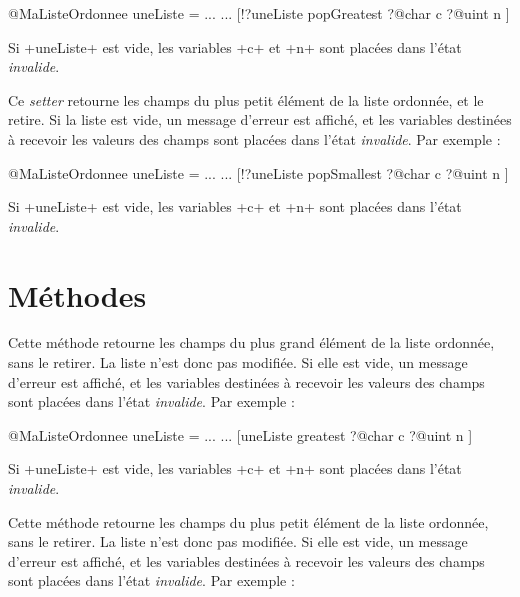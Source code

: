 \begin{galgas}
@MaListeOrdonnee uneListe = ...
...
[!?uneListe popGreatest
  ?@char c
  ?@uint n
]
\end{galgas}

Si \ggs+uneListe+ est vide, les variables \ggs+c+ et \ggs+n+ sont placées dans l'état \emph{invalide}.



Ce \emph{setter} retourne les champs du plus petit élément de la liste ordonnée, et le retire. Si la liste est vide, un message d'erreur est affiché, et les variables destinées à recevoir les valeurs des champs sont placées dans l'état \emph{invalide}. Par exemple :

\begin{galgas}
@MaListeOrdonnee uneListe = ...
...
[!?uneListe popSmallest
  ?@char c
  ?@uint n
]
\end{galgas}

Si \ggs+uneListe+ est vide, les variables \ggs+c+ et \ggs+n+ sont placées dans l'état \emph{invalide}.










\section{Méthodes}


Cette méthode retourne les champs du plus grand élément de la liste ordonnée, sans le retirer. La liste n'est donc pas modifiée. Si elle est vide, un message d'erreur est affiché, et les variables destinées à recevoir les valeurs des champs sont placées dans l'état \emph{invalide}. Par exemple :

\begin{galgas}
@MaListeOrdonnee uneListe = ...
...
[uneListe greatest
  ?@char c
  ?@uint n
]
\end{galgas}

Si \ggs+uneListe+ est vide, les variables \ggs+c+ et \ggs+n+ sont placées dans l'état \emph{invalide}.



Cette méthode retourne les champs du plus petit élément de la liste ordonnée, sans le retirer. La liste n'est donc pas modifiée. Si elle est vide, un message d'erreur est affiché, et les variables destinées à recevoir les valeurs des champs sont placées dans l'état \emph{invalide}. Par exemple :

